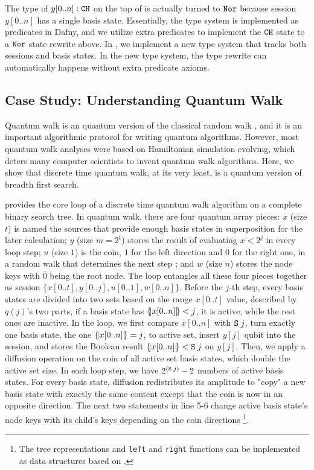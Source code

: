 The type of $y[0..n]:\texttt{CH}$ on the top of  is actually turned to $\texttt{Nor}$ because session $y[0..n]$ has a single basis state. Essentially, the \qafny type system is implemented as predicates in Dafny, and we utilize extra predicates to implement the $\texttt{CH}$ state to a $\texttt{Nor}$ state rewrite above. In , we implement a new type system that tracks both sessions and basis states. In the new type system, the type rewrite can automatically happens without extra predicate axioms.

\subsection{Case Study: Understanding Quantum Walk}\label{sec:quantumwalk}

Quantum walk \cite{Wong_2022,ChildsNAND,Venegas_Andraca_2012} is an quantum version of the classical random walk \cite{RayleighThePO}, and it is an important algorithmic protocol for writing quantum algorithms. However, most quantum walk analyses were based on Hamiltonian simulation evolving, which deters many computer scientists to invent quantum walk algorithms. Here, we show that discrete time quantum walk, at its very least, is a quantum version of breadth first search. 

 provides the core loop of a discrete time quantum walk algorithm on a complete binary search tree. In quantum walk, there are four quantum array pieces: $x$ (size $t$) is named the sources that provide enough basis states in superposition for the later calculation; $y$ (size $m=2^t$) stores the result of evaluating $x<2^j$ in every loop step; $u$ (size $1$) is the coin, $1$ for the left direction and $0$ for the right one, in a random walk that determines the next step ; and $w$ (size $n$) stores the node keys with $\overline{0}$ being the root node. The loop entangles all these four pieces together
as session $\{x[0..t],y[0..j],u[0..1],w[0..n]\}$. Before the $j$-th step, every basis states are divided into two sets based on the range $x[0..t]$ value, described by $q(j)$'s two parts, if a basis state has $\{\hspace{-0.2em}| x[0..n] |\hspace{-0.2em}\}<j$, it is active, while the rest ones are inactive. In the loop, we first compare $x[0..n]$ with $\texttt{S}\;j$, turn exactly one basis state, the one $\{\hspace{-0.2em}| x[0..n] |\hspace{-0.2em}\}=j$, to active set, insert $y[j]$ qubit into the session, and stores the Boolean result $\{\hspace{-0.2em}| x[0..n] |\hspace{-0.2em}\}<\texttt{S}\;j$ on $y[j]$.
Then, we apply a diffusion operation on the coin of all active set basis states, which double the active set size. In each loop step, we have $2^{(\texttt{S}\;j)}-2$ numbers of active basis states.
For every basis state, diffusion redistributes its amplitude to "copy" a new basis state with exactly the same content except that the coin is now in an opposite direction. 
The next two statements in  line 5-6 change active basis state's node keys with its child's keys depending on the coin directions \footnote{The tree representations and \texttt{left} and \texttt{right} functions can be implemented as data structures based on \oqasm.}.

